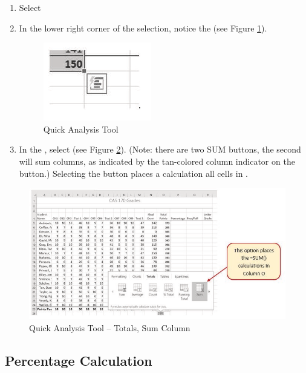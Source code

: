 \begin{enumbox}
	\begin{enumerate}
		\item Select 
		\item In the lower right corner of the selection, notice the  (see Figure \ref{03:fig04}).
	
		\begin{figure}[H]
			\centering
			\includegraphics[width=\maxwidth{.95\linewidth}]{gfx/ch03_fig04}
			\caption{Quick Analysis Tool}
			\label{03:fig04}
		\end{figure}
	
		\item In the , select  (see Figure \ref{03:fig05}). (Note: there are two SUM buttons, the second will sum columns, as indicated by the tan-colored column indicator on the button.) Selecting the  button places a  calculation all cells in .
	\end{enumerate}
\end{enumbox}

\begin{figure}[H]
	\centering
	\includegraphics[width=\maxwidth{.95\linewidth}]{gfx/ch03_fig05}
	\caption{Quick Analysis Tool – Totals, Sum Column}
	\label{03:fig05}
\end{figure}

\subsection{Percentage Calculation}

